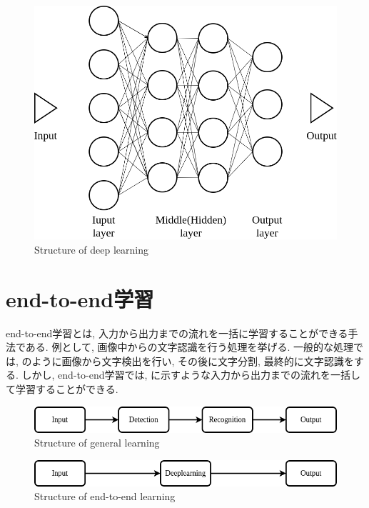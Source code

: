 \begin{figure}[h]
     \centering
     \includegraphics[keepaspectratio, scale=0.3]
     {images/dl.png}
     \caption{Structure of deep learning}
     \label{Fig:dl}
     \end{figure}

\newpage
\section{end-to-end学習}
end-to-end学習とは, 入力から出力までの流れを一括に学習することができる手法である. 例として, 画像中からの文字認識を行う処理を挙げる. 一般的な処理では, のように画像から文字検出を行い, その後に文字分割, 最終的に文字認識をする. しかし, end-to-end学習では, に示すような入力から出力までの流れを一括して学習することができる. 

\vspace{35mm}

\begin{figure}[h]
     \centering
     \includegraphics[keepaspectratio, scale=0.5]
     {images/example.png}
     \caption{Structure of general learning}
     \label{Fig:example}
     \end{figure}

\begin{figure}[h]
     \centering
     \includegraphics[keepaspectratio, scale=0.5]
     {images/end-to-end.png}
     \caption{Structure of end-to-end learning}
     \label{Fig:end-to-end}
     \end{figure}

